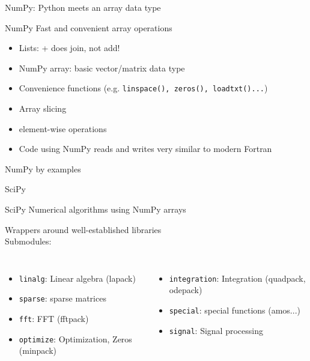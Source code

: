 \begin{frame}{NumPy: Python meets an array data type}

\begin{exbox}{NumPy}
Fast and convenient array operations
\end{exbox}

\begin{itemize}
	\item Lists: + does join, not add!
	\item NumPy array: basic vector/matrix data type
	\item Convenience functions (e.g. {\texttt{linspace(), zeros(), loadtxt()...}})
	\item Array slicing
	\item element-wise operations
	\item Code using NumPy reads and writes very similar to modern Fortran
\end{itemize}

\end{frame}

\begin{frame}[fragile]{NumPy by examples}



\end{frame}

\begin{frame}{SciPy}

\begin{exbox}{SciPy}
Numerical algorithms using NumPy arrays
\end{exbox}

Wrappers around well-established libraries\\[1.0ex]

Submodules:

\begin{columns}


\begin{itemize}
	\item {\texttt{linalg}}: Linear algebra (lapack)
	\item{\texttt{sparse}}: sparse matrices
	\item {\texttt{fft}}: FFT (fftpack)
	\item {\texttt{optimize}}: Optimization, Zeros (minpack)
\end{itemize}



\begin{itemize}
	\item {\texttt{integration}}: Integration (quadpack, odepack)
	\item {\texttt{special}}: special functions (amos...)
	\item {\texttt{signal}}: Signal processing
\end{itemize}

\end{columns}

\end{frame}

